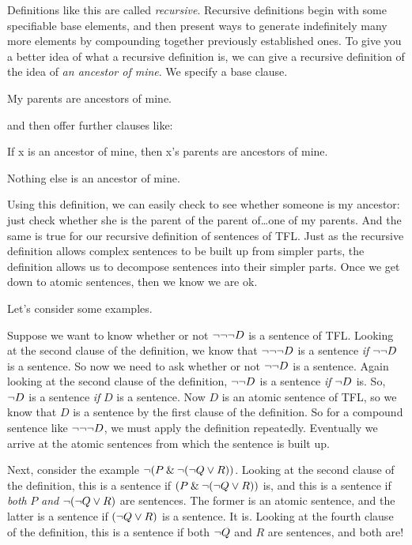 Definitions like this are called \emph{recursive}. Recursive definitions begin with some specifiable base elements, and then present ways to generate indefinitely many more elements by compounding together previously established ones. To give you a better idea of what a recursive definition is, we can give a recursive definition of the idea of \emph{an ancestor of mine}. We specify a base clause.
	\begin{ebullet}
		\item My parents are ancestors of mine.
	\end{ebullet}
and then offer further clauses like:
	\begin{ebullet}
		\item If x is an ancestor of mine, then x's parents are ancestors of mine.
		\item Nothing else is an ancestor of mine.
	\end{ebullet}
Using this definition, we can easily check to see whether someone is my ancestor: just check whether she is the parent of the parent of\ldots one of my parents. And the same is true for our recursive definition of sentences of TFL. Just as the recursive definition allows complex sentences to be built up from simpler parts, the definition allows us to decompose sentences into their simpler parts. Once we get down to atomic sentences, then we know we are ok. 

Let's consider some examples.

Suppose we want to know whether or not $\neg \neg \neg D$ is a sentence of TFL. Looking at the second clause of the definition, we know that $\neg \neg \neg D$ is a sentence \emph{if} $\neg \neg D$ is a sentence. So now we need to ask whether or not $\neg \neg D$ is a sentence. Again looking at the second clause of the definition, $\neg \neg D$ is a sentence \emph{if} $\neg D$ is. So, $\neg D$ is a sentence \emph{if} $D$ is a sentence. Now $D$ is an atomic sentence of TFL, so we know that $D$ is a sentence by the first clause of the definition. So for a compound sentence like $\neg \neg \neg D$, we must apply the definition repeatedly. Eventually we arrive at the atomic sentences from which the sentence is built up.

Next, consider the example $\neg (P \mathbin{\&} \neg (\neg Q \vee R))$. Looking at the second clause of the definition, this is a sentence if $(P \mathbin{\&} \neg (\neg Q \vee R))$ is, and this is a sentence if \emph{both} $P$ \emph{and} $\neg (\neg Q \vee R)$ are sentences. The former is an atomic sentence, and the latter is a sentence if $(\neg Q \vee R)$ is a sentence. It is. Looking at the fourth clause of the definition, this is a sentence if both $\neg Q$ and $R$ are sentences, and both are! 



